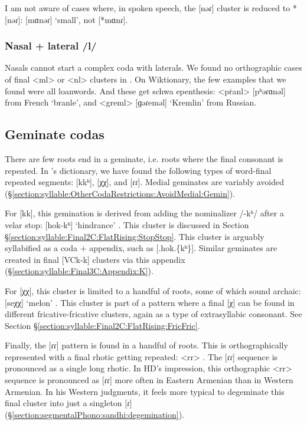 	I am not aware of cases where, in spoken speech, the [nəɾ] cluster is reduced to *[nəɾ]: [mɑnəɾ] `small', not [*mɑnɾ]. 
	
	\subsubsection{Nasal + lateral /l/}\label{section:syllable:Final2C:FlatRising:NasalLateral}
	Nasals cannot start a complex coda with laterals. We   found no orthographic cases of final <ml> or <nl> clusters in \citeauthor{kouyoumdjian-1970-DictionaryArmenianEnglish}. On Wiktionary, the few examples that we found were all loanwords. And these get schwa epenthesis: <pṙanl> [pʰəɾɑnəl]  from French `branle', and <greml> [ɡəɾeməl] `Kremlin'  from Russian. 
	
	\subsection{Geminate codas}\label{section:syllable:Final2C:Geminate}
	There are few roots end in a geminate, i.e. roots where the final consonant is repeated. In \citeauthor{kouyoumdjian-1970-DictionaryArmenianEnglish}'s dictionary, we have found the following types of word-final repeated segments: [kkʰ], [χχ],  and [ɾɾ]. Medial geminates are variably avoided (\S\ref{section:syllable:OtherCodaRestrictions:AvoidMedial:Gemin}). 
	
	
	For [kk], this gemination is derived from adding the nominalizer /-kʰ/ after a velar stop: [hok-kʰ] `hindrance' . This cluster is discussed in  Section \S\ref{section:syllable:Final2C:FlatRising:StopStop}. This cluster is arguably syllabified as a coda + appendix, such as [.hok.\{kʰ\}]. Similar geminates are created in final [VCk-k] clusters via this appendix (\S\ref{section:syllable:Final3C:Appendix:K}).  
	
	For [χχ], this cluster is limited to a handful of roots, some of which sound archaic: [seχχ] `melon' . This cluster is part of a pattern where a final [χ] can be found in different fricative-fricative clusters, again as a type of extrasyllabic consonant. See Section \S\ref{section:syllable:Final2C:FlatRising:FricFric}. 
	
	Finally, the [ɾɾ] pattern is found in a handful of roots. This is orthographically represented with a final rhotic getting repeated: <rr> . The [ɾɾ] sequence is pronounced as a single long rhotic. In HD's impression, this orthographic <rr> sequence is pronounced as [ɾɾ] more often in Eastern Armenian than in Western Armenian. In his Western judgments, it feels more typical to degeminate this final cluster into just a singleton [ɾ] (\S\ref{section:segmentalPhono:sandhi:degemination}). 
	
